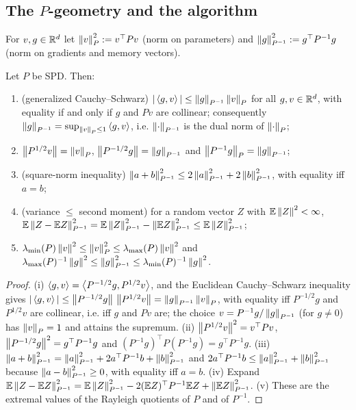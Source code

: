 \subsection{The \texorpdfstring{$P$}{P}-geometry and the algorithm}
\label{sec:B1-algo}

\begin{definition}\label{def:B1-norms}
For $v,g\in\mathbb{R}^d$ let $\left\|v\right\|_P^2:=v^\top P v$ (norm on parameters) and
$\left\|g\right\|_{P^{-1}}^2:=g^\top P^{-1} g$ (norm on gradients and memory vectors).
\end{definition}

\begin{lemma}\label{lem:B1-geometry}
Let $P$ be SPD. Then:
\begin{enumerate}[label=(\roman*)]
\item (generalized Cauchy--Schwarz) $|\left\langle g, v \right\rangle|\le \left\|g\right\|_{P^{-1}}\left\|v\right\|_P$ for all $g,v\in\mathbb{R}^d$,
with equality if and only if $g$ and $Pv$ are collinear; consequently
$\left\|g\right\|_{P^{-1}}=\sup_{\left\|v\right\|_P\le 1}\left\langle g, v \right\rangle$, i.e. $\left\|\cdot\right\|_{P^{-1}}$ is the dual norm of
$\left\|\cdot\right\|_P$;
\item $\left\|P^{1/2}v\right\|=\left\|v\right\|_P$, $\left\|P^{-1/2}g\right\|=\left\|g\right\|_{P^{-1}}$ and $\left\|P^{-1}g\right\|_P=\left\|g\right\|_{P^{-1}}$;
\item (square-norm inequality) $\left\|a+b\right\|_{P^{-1}}^2\le 2\left\|a\right\|_{P^{-1}}^2+2\left\|b\right\|_{P^{-1}}^2$,
with equality iff $a=b$;
\item (variance $\le$ second moment) for a random vector $Z$ with $\mathbb{E}\left\|Z\right\|^2<\infty$,
$\mathbb{E}\left\|Z-\mathbb{E} Z\right\|_{P^{-1}}^2=\mathbb{E}\left\|Z\right\|_{P^{-1}}^2-\left\|\mathbb{E} Z\right\|_{P^{-1}}^2\le \mathbb{E}\left\|Z\right\|_{P^{-1}}^2$;
\item $\lambda_{\min}(P)\left\|v\right\|^2\le\left\|v\right\|_P^2\le\lambda_{\max}(P)\left\|v\right\|^2$ and
$\lambda_{\max}(P)^{-1}\left\|g\right\|^2\le\left\|g\right\|_{P^{-1}}^2\le\lambda_{\min}(P)^{-1}\left\|g\right\|^2$.
\end{enumerate}
\end{lemma}
\begin{proof}
(i) $\left\langle g, v \right\rangle=\left\langle P^{-1/2}g, P^{1/2}v \right\rangle$, and the Euclidean Cauchy--Schwarz inequality gives
$|\left\langle g, v \right\rangle|\le\left\|P^{-1/2}g\right\|\,\left\|P^{1/2}v\right\|=\left\|g\right\|_{P^{-1}}\left\|v\right\|_P$, with equality iff
$P^{-1/2}g$ and $P^{1/2}v$ are collinear, i.e. iff $g$ and $Pv$ are; the choice
$v=P^{-1}g/\left\|g\right\|_{P^{-1}}$ (for $g\neq0$) has $\left\|v\right\|_P=1$ and attains the supremum.
(ii) $\left\|P^{1/2}v\right\|^2=v^\top Pv$, $\left\|P^{-1/2}g\right\|^2=g^\top P^{-1}g$ and
$(P^{-1}g)^\top P(P^{-1}g)=g^\top P^{-1}g$.
(iii) $\left\|a+b\right\|_{P^{-1}}^2=\left\|a\right\|_{P^{-1}}^2+2a^\top P^{-1}b+\left\|b\right\|_{P^{-1}}^2$ and
$2a^\top P^{-1}b\le\left\|a\right\|_{P^{-1}}^2+\left\|b\right\|_{P^{-1}}^2$ because
$\left\|a-b\right\|_{P^{-1}}^2\ge0$, with equality iff $a=b$.
(iv) Expand $\mathbb{E}\left\|Z-\mathbb{E} Z\right\|_{P^{-1}}^2=\mathbb{E}\left\|Z\right\|_{P^{-1}}^2-2(\mathbb{E} Z)^\top P^{-1}\mathbb{E} Z+\left\|\mathbb{E} Z\right\|_{P^{-1}}^2$.
(v) These are the extremal values of the Rayleigh quotients of $P$ and of $P^{-1}$.
\end{proof}

